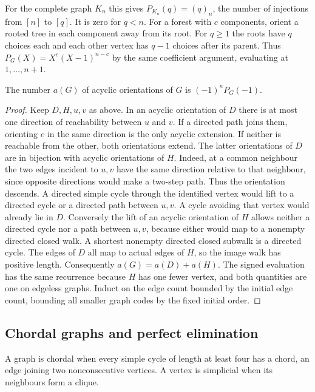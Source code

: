 For the complete graph $K_n$ this gives $P_{K_n}(q)=(q)_n$, the number of
injections from $[n]$ to $[q]$. It is zero for $q<n$. For a forest with
$c$ components, orient a rooted tree in each component away from its root.
For $q\ge 1$ the roots have $q$ choices each and each other vertex has
$q-1$ choices after its parent. Thus $P_G(X)=X^c(X-1)^{n-c}$ by the
same coefficient argument, evaluating at $1,\ldots,n+1$.

\begin{theorem}\leavevmode\label{co:stanley}
The number $a(G)$ of acyclic orientations of $G$ is $(-1)^nP_G(-1)$.
\end{theorem}
\begin{proof}
Keep $D,H,u,v$ as above. In an acyclic orientation of $D$ there is at
most one direction of reachability between $u$ and $v$. If a directed
path joins them, orienting $e$ in the same direction is the only acyclic
extension. If neither is reachable from the other, both orientations extend.
The latter orientations of $D$ are in bijection with acyclic orientations
of $H$. Indeed, at a common neighbour the two edges incident to $u,v$ have
the same direction relative to that neighbour, since opposite directions
would make a two-step path. Thus the orientation descends. A directed
simple cycle through the identified vertex would lift to a directed cycle
or a directed path between $u,v$. A cycle avoiding that vertex would already
lie in $D$. Conversely the lift of an acyclic orientation of $H$ allows
neither a directed cycle nor a path between $u,v$, because either would
map to a nonempty directed closed walk. A shortest nonempty directed
closed subwalk is a directed cycle. The edges of $D$ all map to actual
edges of $H$, so the image walk has positive length.
Consequently $a(G)=a(D)+a(H)$. The signed evaluation has the same
recurrence because $H$ has one fewer vertex, and both quantities are one
on edgeless graphs. Induct on the edge count bounded by the initial edge
count, bounding all smaller graph codes by the fixed initial order.
\end{proof}

\subsection{Chordal graphs and perfect elimination}
A graph is chordal when every simple cycle of length at least four has a
chord, an edge joining two nonconsecutive vertices. A vertex is simplicial
when its neighbours form a clique.

